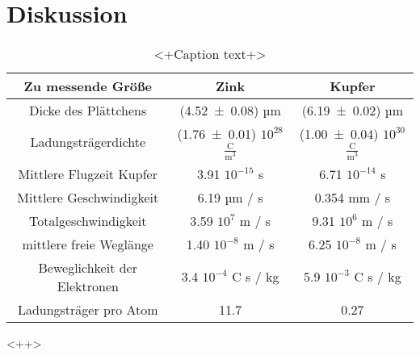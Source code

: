 \section{Diskussion}
\label{sec:Diskussion}

\begin{table}
  \centering
  \begin{tabular}{c|c c}
    \toprule
	Zu messende Größe & Zink & Kupfer \\
    \midrule
	Dicke des Plättchens & (\num{4.52 +- 0.08}) µm & (\num{6.19 +- 0.02}) µm \\
	Ladungsträgerdichte & (\num{1.76 +- 0.01}) $10^{28}$ $\frac{\text{C}}{\text{m}^3}$ & (\num{1.00 +- 0.04}) $10^{30}$ $\frac{\text{C}}{\text{m}^3}$\\
	Mittlere Flugzeit Kupfer & 3.91 \cdot $10^{-15}$ s & 6.71 \cdot $10^{-14}$ s \\
	Mittlere Geschwindigkeit & 6.19 µm / s & 0.354 mm / s \\
	Totalgeschwindigkeit & 3.59 \cdot $10^7$ m / s & 9.31 \cdot $10^6$ m / s\\
	mittlere freie Weglänge & 1.40 \cdot $10^{-8}$ m / s& 6.25 \cdot $10^{-8}$ m / s \\
	Beweglichkeit der Elektronen & 3.4 \cdot $10^{-4}$ C \cdot s / kg & 5.9 \cdot $10^{-3}$ C \cdot s / kg \\
	Ladungsträger pro Atom & 11.7 & 0.27 \\

    \bottomrule
  \end{tabular}
  \caption{<+Caption text+>}
  \label{tab:<+label+>}
\end{table}<++>
